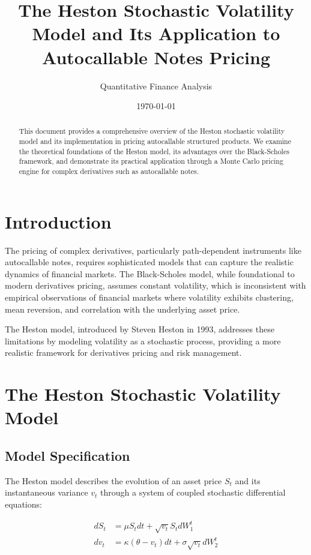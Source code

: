 \documentclass[12pt,a4paper]{article}
\title{The Heston Stochastic Volatility Model and Its Application to Autocallable Notes Pricing}
\author{Quantitative Finance Analysis}
\date{\today}
\begin{document}
\maketitle

\begin{abstract}
This document provides a comprehensive overview of the Heston stochastic volatility model and its implementation in pricing autocallable structured products. We examine the theoretical foundations of the Heston model, its advantages over the Black-Scholes framework, and demonstrate its practical application through a Monte Carlo pricing engine for complex derivatives such as autocallable notes.
\end{abstract}

\section{Introduction}

The pricing of complex derivatives, particularly path-dependent instruments like autocallable notes, requires sophisticated models that can capture the realistic dynamics of financial markets. The Black-Scholes model, while foundational to modern derivatives pricing, assumes constant volatility, which is inconsistent with empirical observations of financial markets where volatility exhibits clustering, mean reversion, and correlation with the underlying asset price.

The Heston model, introduced by Steven Heston in 1993, addresses these limitations by modeling volatility as a stochastic process, providing a more realistic framework for derivatives pricing and risk management.

\section{The Heston Stochastic Volatility Model}

\subsection{Model Specification}

The Heston model describes the evolution of an asset price $S_t$ and its instantaneous variance $v_t$ through a system of coupled stochastic differential equations:

\begin{align}
dS_t &= \mu S_t dt + \sqrt{v_t} S_t dW_1^t \label{eq:asset_price}\\
dv_t &= \kappa(\theta - v_t)dt + \sigma\sqrt{v_t} dW_2^t \label{eq:variance}
\end{align}
\end{document}
